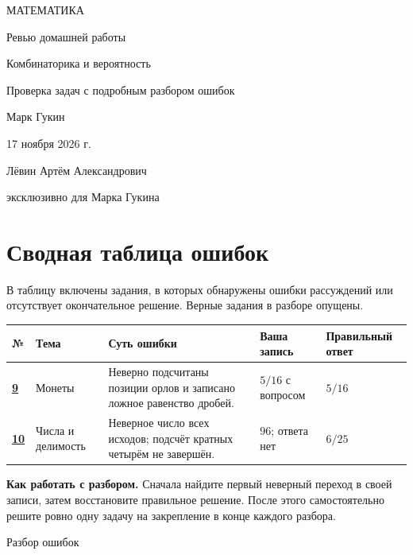 \documentclass[a4paper,12pt]{article}
\begin{document}
\thispagestyle{empty}
\begin{center}
  \vspace*{38mm}
  {\color{accent}\large МАТЕМАТИКА}\par
  \vspace{15mm}
  {\LARGE Ревью домашней работы}\par
  \vspace{9mm}
  {\Large\color{accent}Комбинаторика и вероятность}\par
  \vspace{18mm}
  {\normalsize Проверка задач с подробным разбором ошибок}\par
  \vspace{29mm}
  {\large Марк Гукин}\par
  \vspace{13mm}
  {17 ноября 2026 г.}\par
  \vfill
  {\small Лёвин Артём Александрович}\par
  {\small эксклюзивно для Марка Гукина}\par
  \vspace{17mm}
\end{center}
\clearpage
{}
\section*{Сводная таблица ошибок}
В таблицу включены задания, в которых обнаружены ошибки рассуждений или отсутствует окончательное решение. Верные задания в разборе опущены.
\par\medskip
\normalsize
\renewcommand{\arraystretch}{1.5}
\begin{tabularx}{\linewidth}{@{}p{10mm}p{25mm}X p{25mm}p{26mm}@{}}
\toprule
№ & Тема & Суть ошибки & Ваша запись & Правильный ответ\\
\midrule
\hyperref[task:9]{\textbf{9}} & Монеты & Неверно подсчитаны позиции орлов и записано ложное равенство дробей. & $5/16$ с вопросом & $5/16$\\
\hyperref[task:10]{\textbf{10}} & Числа и делимость & Неверное число всех исходов; подсчёт кратных четырём не завершён. & $96$; ответа нет & $6/25$\\
\bottomrule
\end{tabularx}
\normalsize
\par\vspace{13mm}
\textbf{Как работать с разбором.} Сначала найдите первый неверный переход в своей записи, затем восстановите правильное решение. После этого самостоятельно решите ровно одну задачу на закрепление в конце каждого разбора.
\clearpage
\thispagestyle{empty}
\vspace*{0.35\textheight}
\begin{center}
  {\color{accent}\LARGE Разбор ошибок}
\end{center}
\clearpage
{}\label{task:9}
\end{document}

